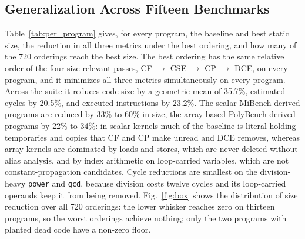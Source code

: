 \documentclass[conference,a4paper]{IEEEtran}
\begin{document}
\subsection{Generalization Across Fifteen Benchmarks}
\label{sec:classes}
Table~\ref{tab:per_program} gives, for every program, the baseline and best static size, the reduction in all three metrics under the best ordering, and how many of the 720 orderings reach the best size. The best ordering has the same relative order of the four size-relevant passes, CF $\to$ CSE $\to$ CP $\to$ DCE, on every program, and it minimizes all three metrics simultaneously on every program. Across the suite it reduces code size by a geometric mean of 35.7\%, estimated cycles by 20.5\%, and executed instructions by 23.2\%. The scalar MiBench-derived programs are reduced by 33\% to 60\% in size, the array-based PolyBench-derived programs by 22\% to 34\%: in scalar kernels much of the baseline is literal-holding temporaries and copies that CF and CP make unread and DCE removes, whereas array kernels are dominated by loads and stores, which are never deleted without alias analysis, and by index arithmetic on loop-carried variables, which are not constant-propagation candidates. Cycle reductions are smallest on the division-heavy \texttt{power} and \texttt{gcd}, because division costs twelve cycles and its loop-carried operands keep it from being removed. Fig.~\ref{fig:box} shows the distribution of size reduction over all 720 orderings: the lower whisker reaches zero on thirteen programs, so the worst orderings achieve nothing; only the two programs with planted dead code have a non-zero floor.
\end{document}
